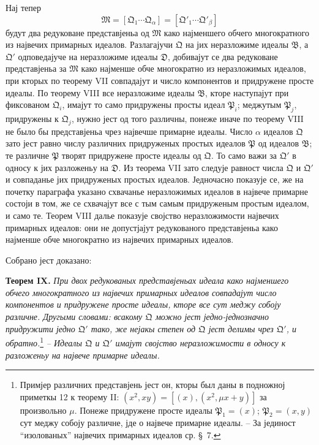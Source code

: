 ﻿\documentclass[11pt]{article}
\newcommand{\ideal}[1]{\mathfrak{#1}}
\begin{document}
Нај тепер
\[
 \ideal M=[\ideal Q_1\cdots\ideal Q_\alpha]=[\ideal Q'_1\cdots\ideal Q'_\beta]
\]
будут два редуковане представјеньа од \(\ideal M\) како најменшего обчего многократного из највечих примарных идеалов. Разлагајучи \(\ideal Q\) на јих неразложиме идеалы \(\ideal B\), а \(\ideal Q'\) одповедајуче на неразложиме идеалы \(\ideal D\), добивајут се два редуковане представјеньа за \(\ideal M\) како најменше обче многократно из неразложимых идеалов, при кторых по теорему VII совпадајут и число компонентов и придружене просте идеалы. По теорему VIII все неразложиме идеалы \(\ideal B\), кторе наступајут при фиксованом \(\ideal Q_i\), имајут то само придружены просты идеал \(\ideal P_i\); меджутым \(\ideal P_j\), придружены к \(\ideal Q_j\), нужно јест од того различны, понеже иначе по теорему VIII не было бы представјеньа чрез највечше примарне идеалы. Число \(\alpha\) идеалов \(\ideal Q\) зато јест равно числу различних придруженых простых идеалов \(\ideal P\) од идеалов \(\ideal B\); те различне \(\ideal P\) творят придружене просте идеалы од \(\ideal Q\). То само важи за \(\ideal Q'\) в односу к јих разложеньу на \(\ideal D\). Из теорема VII зато следује равност числа \(\ideal Q\) и \(\ideal Q'\) и совпаданье јих придруженых простых идеалов. Једночасно показује се, же на почетку параграфа указано схвачанье неразложимых идеалов в највече примарне состоји в том, же се схвачајут все с тым самым придруженым простым идеалом, и само те. Теорем VIII далье показује својство неразложимости највечих примарных идеалов: они не допустјајут редукованого представјеньа како најменше обче многократно из највечих примарных идеалов.

Собрано јест доказано:

\textbf{Теорем IX.} \emph{При двох редукованых представјеньах идеала како најменшего обчего многократного из највечих примарных идеалов совпадајут число компонентов и придружене просте идеалы, кторе все сут меджу собоју различне. Другыми словами: всакому \(\ideal Q\) можно јест једно-једнозначно придружити једно \(\ideal Q'\) тако, же нејакы степен од \(\ideal Q\) јест делимы чрез \(\ideal Q'\), и обратно.}\footnote{Примјер различних представјень јест он, кторы был даны в подножној приметкы 12 к теорему II: \((x^2,xy)=[(x),(x^2,\mu x+y)]\) за произвольно \(\mu\). Понеже придружене просте идеалы \(\ideal P_1=(x)\); \(\ideal P_2=(x,y)\) сут меджу собоју различне, јде о највече примарне идеалы. -- За јединост ``изолованых'' највечих примарных идеалов ср. \S~7.} \emph{-- Идеалы \(\ideal Q\) и \(\ideal Q'\) имајут својство неразложимости в односу к разложеньу на највече примарне идеалы.}
\end{document}
